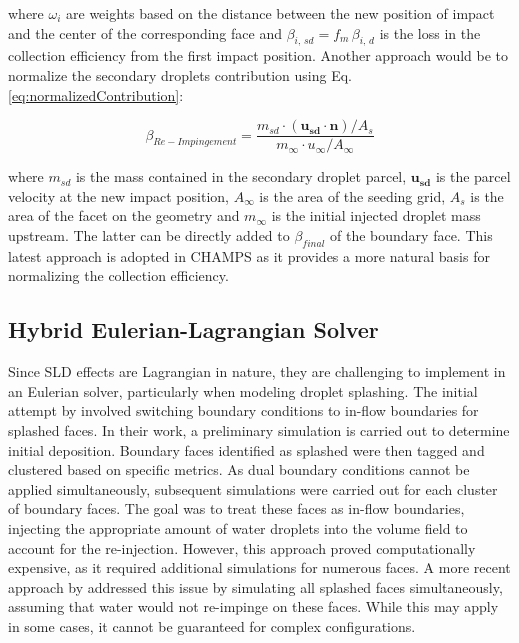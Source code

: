 \noindent where $\omega_i$ are weights based on the distance between the new position of impact and the center of the corresponding face and $\beta_{i, \, sd} = f_m \, \beta_{i, \, d}$ is the loss in the collection efficiency from the first impact position. Another approach would be to normalize the secondary droplets contribution using Eq. \ref{eq:normalizedContribution}: 

\begin{equation}
    \beta_{Re-Impingement} = \frac{ m_{sd} \cdot (\boldsymbol{u_{sd}} \cdot \boldsymbol{n})/ A_s}{m_\infty \cdot  u_\infty /  A_\infty} 
    \label{eq:normalizedContribution}
\end{equation}

\noindent where $m_{sd}$ is the mass contained in the secondary droplet parcel, $\boldsymbol{u_{sd}}$ is the parcel velocity at the new impact position, $A_\infty$ is the area of the seeding grid, $A_s$ is the area of the facet on the geometry and $m_\infty$ is the initial injected droplet mass upstream. The latter can be directly added to $\beta_{final}$ of the boundary face. This latest approach is adopted in CHAMPS as it provides a more natural basis for normalizing the collection efficiency.

\subsection{Hybrid Eulerian-Lagrangian Solver}
Since SLD effects are Lagrangian in nature, they are challenging to implement in an Eulerian solver, particularly when modeling droplet splashing. The initial attempt by \cite{bilodeau2016numerical} involved switching boundary conditions to in-flow boundaries for splashed faces. In their work, a preliminary simulation is carried out to determine initial deposition. Boundary faces identified as splashed were then tagged and clustered based on specific metrics. As dual boundary conditions cannot be applied simultaneously, subsequent simulations were carried out for each cluster of boundary faces. The goal was to treat these faces as in-flow boundaries, injecting the appropriate amount of water droplets into the volume field to account for the re-injection. However, this approach proved computationally expensive, as it required additional simulations for numerous faces. A more recent approach by \cite{catalano2023modelling} addressed this issue by simulating all splashed faces simultaneously, assuming that water would not re-impinge on these faces. While this may apply in some cases, it cannot be guaranteed for complex configurations.

